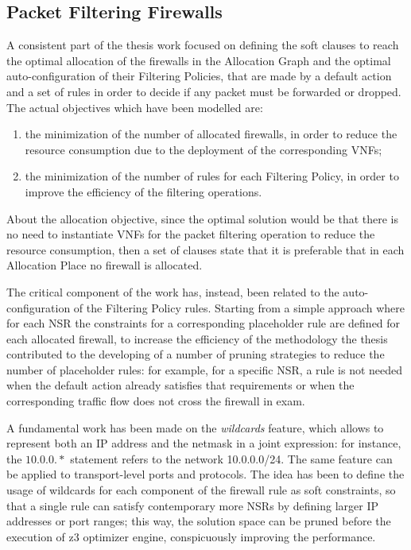 \documentclass[10pt,a4paper,roman, twocolumn]{article}
\begin{document}
\subsection{Packet Filtering Firewalls}

A consistent part of the thesis work focused on defining the soft clauses to reach the optimal allocation of the firewalls in the Allocation Graph and the optimal auto-configuration of their Filtering Policies, that are made by a default action and a set of rules in order to decide if any packet must be forwarded or dropped. The actual objectives which have been modelled are:
\begin{enumerate}
	\setlength\itemsep{-0.3em}
	\item the minimization of the number of allocated firewalls, in order to reduce the resource consumption due to the deployment of the corresponding VNFs;
	\item the minimization of the number of rules for each Filtering Policy, in order to improve the efficiency of the filtering operations. 
\end{enumerate}

About the allocation objective, since the optimal solution would be that there is no need to instantiate VNFs for the packet filtering operation to reduce the resource consumption, then a set of clauses state that it is preferable that in each Allocation Place no firewall is allocated.%


The critical component of the work has, instead, been related to the auto-configuration of the Filtering Policy rules. Starting from a simple approach where for each NSR the constraints for a corresponding placeholder rule are defined for each allocated firewall, to increase the efficiency of the methodology the thesis contributed to the developing of a number of pruning strategies to reduce the number of placeholder rules: for example, for a specific NSR, a rule is not needed when the default action already satisfies that requirements or when the corresponding traffic flow does not cross the firewall in exam.

A fundamental work has been made on the \textit{wildcards} feature, which allows to represent both an IP address and the netmask in a joint expression: for instance, the $10.0.0.\ast$ statement refers to the network 10.0.0.0/24. The same feature can be applied to transport-level ports and protocols. The idea has been to define the usage of wildcards for each component of the firewall rule as soft constraints, so that a single rule can satisfy contemporary more NSRs by defining larger IP addresses or port  ranges; this way, the solution space can be pruned before the execution of z3 optimizer engine, conspicuously improving the performance. 
\end{document}
